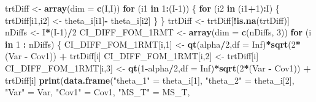 \documentclass[
]{book}
\newenvironment{Shaded}{\begin{snugshade}}{\end{snugshade}}
\newcommand{\ControlFlowTok}[1]{\textcolor[rgb]{0.13,0.29,0.53}{\textbf{#1}}}
\newcommand{\DataTypeTok}[1]{\textcolor[rgb]{0.13,0.29,0.53}{#1}}
\newcommand{\DecValTok}[1]{\textcolor[rgb]{0.00,0.00,0.81}{#1}}
\newcommand{\KeywordTok}[1]{\textcolor[rgb]{0.13,0.29,0.53}{\textbf{#1}}}
\newcommand{\NormalTok}[1]{#1}
\newcommand{\OperatorTok}[1]{\textcolor[rgb]{0.81,0.36,0.00}{\textbf{#1}}}
\newcommand{\OtherTok}[1]{\textcolor[rgb]{0.56,0.35,0.01}{#1}}
\newcommand{\StringTok}[1]{\textcolor[rgb]{0.31,0.60,0.02}{#1}}
\begin{document}
\begin{Shaded}
\begin{Highlighting}[]
\NormalTok{trtDiff \textless{}{-}}\StringTok{ }\KeywordTok{array}\NormalTok{(}\DataTypeTok{dim =} \KeywordTok{c}\NormalTok{(I,I))}
\ControlFlowTok{for}\NormalTok{ (i1 }\ControlFlowTok{in} \DecValTok{1}\OperatorTok{:}\NormalTok{(I}\DecValTok{{-}1}\NormalTok{)) \{    }
  \ControlFlowTok{for}\NormalTok{ (i2 }\ControlFlowTok{in}\NormalTok{ (i1}\OperatorTok{+}\DecValTok{1}\NormalTok{)}\OperatorTok{:}\NormalTok{I) \{}
\NormalTok{    trtDiff[i1,i2] \textless{}{-}}\StringTok{ }\NormalTok{theta\_i[i1]}\OperatorTok{{-}}\StringTok{ }\NormalTok{theta\_i[i2]    }
\NormalTok{  \}}
\NormalTok{\}}
\NormalTok{trtDiff \textless{}{-}}\StringTok{ }\NormalTok{trtDiff[}\OperatorTok{!}\KeywordTok{is.na}\NormalTok{(trtDiff)]}
\NormalTok{nDiffs \textless{}{-}}\StringTok{ }\NormalTok{I}\OperatorTok{*}\NormalTok{(I}\DecValTok{{-}1}\NormalTok{)}\OperatorTok{/}\DecValTok{2}
\NormalTok{CI\_DIFF\_FOM\_1RMT \textless{}{-}}\StringTok{ }\KeywordTok{array}\NormalTok{(}\DataTypeTok{dim =} \KeywordTok{c}\NormalTok{(nDiffs, }\DecValTok{3}\NormalTok{))}
\ControlFlowTok{for}\NormalTok{ (i }\ControlFlowTok{in} \DecValTok{1} \OperatorTok{:}\StringTok{ }\NormalTok{nDiffs) \{}
\NormalTok{  CI\_DIFF\_FOM\_1RMT[i,}\DecValTok{1}\NormalTok{] \textless{}{-}}\StringTok{ }\KeywordTok{qt}\NormalTok{(alpha}\OperatorTok{/}\DecValTok{2}\NormalTok{,}\DataTypeTok{df =} \OtherTok{Inf}\NormalTok{)}\OperatorTok{*}\KeywordTok{sqrt}\NormalTok{(}\DecValTok{2}\OperatorTok{*}\NormalTok{(Var }\OperatorTok{{-}}\StringTok{ }\NormalTok{Cov1)) }\OperatorTok{+}\StringTok{ }\NormalTok{trtDiff[i]}
\NormalTok{  CI\_DIFF\_FOM\_1RMT[i,}\DecValTok{2}\NormalTok{] \textless{}{-}}\StringTok{ }\NormalTok{trtDiff[i]}
\NormalTok{  CI\_DIFF\_FOM\_1RMT[i,}\DecValTok{3}\NormalTok{] \textless{}{-}}\StringTok{ }\KeywordTok{qt}\NormalTok{(}\DecValTok{1}\OperatorTok{{-}}\NormalTok{alpha}\OperatorTok{/}\DecValTok{2}\NormalTok{,}\DataTypeTok{df =} \OtherTok{Inf}\NormalTok{)}\OperatorTok{*}\KeywordTok{sqrt}\NormalTok{(}\DecValTok{2}\OperatorTok{*}\NormalTok{(Var }\OperatorTok{{-}}\StringTok{ }\NormalTok{Cov1)) }\OperatorTok{+}\StringTok{ }\NormalTok{trtDiff[i]}
  \KeywordTok{print}\NormalTok{(}\KeywordTok{data.frame}\NormalTok{(}\StringTok{"theta\_1"}\NormalTok{ =}\StringTok{ }\NormalTok{theta\_i[}\DecValTok{1}\NormalTok{],}
                   \StringTok{"theta\_2"}\NormalTok{ =}\StringTok{ }\NormalTok{theta\_i[}\DecValTok{2}\NormalTok{],}
                   \StringTok{"Var"}\NormalTok{ =}\StringTok{ }\NormalTok{Var,}
                   \StringTok{"Cov1"}\NormalTok{ =}\StringTok{ }\NormalTok{Cov1,}
                   \StringTok{"MS\_T"}\NormalTok{ =}\StringTok{ }\NormalTok{MS\_T,}

\end{Highlighting}
\end{Shaded}
\end{document}
